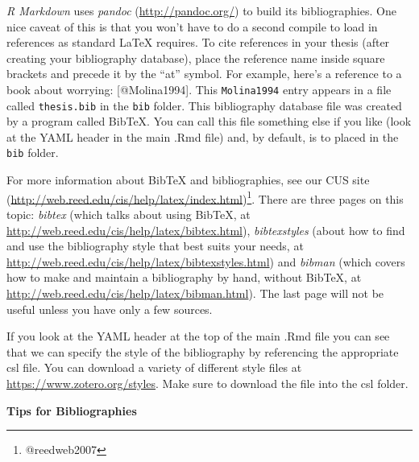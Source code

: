 \documentclass[12pt,twoside]{reedthesis}
\begin{document}
  \emph{R Markdown} uses \emph{pandoc} (\url{http://pandoc.org/}) to build
  its bibliographies. One nice caveat of this is that you won't have to do
  a second compile to load in references as standard LaTeX requires. To
  cite references in your thesis (after creating your bibliography
  database), place the reference name inside square brackets and precede
  it by the ``at'' symbol. For example, here's a reference to a book about
  worrying: {[}@Molina1994{]}. This \texttt{Molina1994} entry appears in a
  file called \texttt{thesis.bib} in the \texttt{bib} folder. This
  bibliography database file was created by a program called BibTeX. You
  can call this file something else if you like (look at the YAML header
  in the main .Rmd file) and, by default, is to placed in the \texttt{bib}
  folder.
  
  For more information about BibTeX and bibliographies, see our CUS site
  (\url{http://web.reed.edu/cis/help/latex/index.html})\footnote{@reedweb2007}.
  There are three pages on this topic: \emph{bibtex} (which talks about
  using BibTeX, at \url{http://web.reed.edu/cis/help/latex/bibtex.html}),
  \emph{bibtexstyles} (about how to find and use the bibliography style
  that best suits your needs, at
  \url{http://web.reed.edu/cis/help/latex/bibtexstyles.html}) and
  \emph{bibman} (which covers how to make and maintain a bibliography by
  hand, without BibTeX, at
  \url{http://web.reed.edu/cis/help/latex/bibman.html}). The last page
  will not be useful unless you have only a few sources.
  
  If you look at the YAML header at the top of the main .Rmd file you can
  see that we can specify the style of the bibliography by referencing the
  appropriate csl file. You can download a variety of different style
  files at \url{https://www.zotero.org/styles}. Make sure to download the
  file into the csl folder.
  
  \textbf{Tips for Bibliographies}
  
\end{document}
